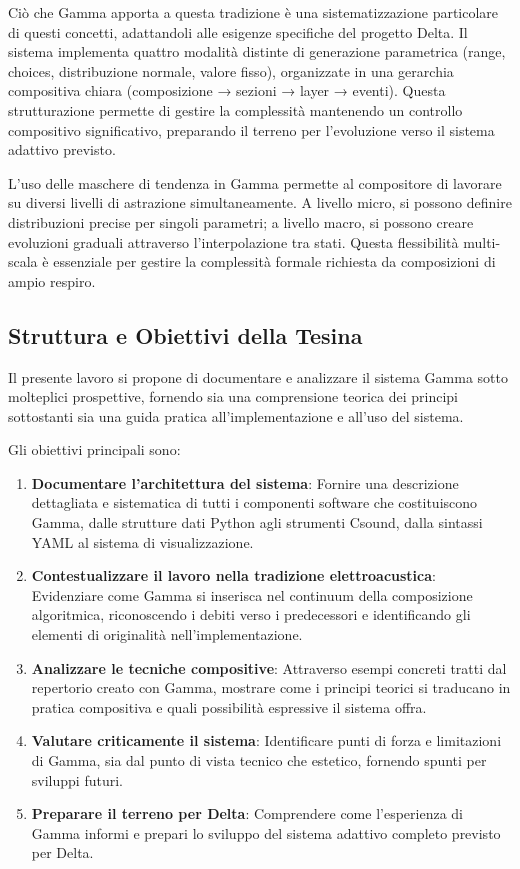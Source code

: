 Ciò che Gamma apporta a questa tradizione è una sistematizzazione particolare di questi concetti, adattandoli alle esigenze specifiche del progetto Delta. Il sistema implementa quattro modalità distinte di generazione parametrica (range, choices, distribuzione normale, valore fisso), organizzate in una gerarchia compositiva chiara (composizione → sezioni → layer → eventi). Questa strutturazione permette di gestire la complessità mantenendo un controllo compositivo significativo, preparando il terreno per l'evoluzione verso il sistema adattivo previsto.

L'uso delle maschere di tendenza in Gamma permette al compositore di lavorare su diversi livelli di astrazione simultaneamente. A livello micro, si possono definire distribuzioni precise per singoli parametri; a livello macro, si possono creare evoluzioni graduali attraverso l'interpolazione tra stati. Questa flessibilità multi-scala è essenziale per gestire la complessità formale richiesta da composizioni di ampio respiro.
\subsection{Struttura e Obiettivi della Tesina}
Il presente lavoro si propone di documentare e analizzare il sistema Gamma sotto molteplici prospettive, fornendo sia una comprensione teorica dei principi sottostanti sia una guida pratica all'implementazione e all'uso del sistema.

Gli obiettivi principali sono:

\begin{enumerate}
    \item \textbf{Documentare l'architettura del sistema}: Fornire una descrizione dettagliata e sistematica di tutti i componenti software che costituiscono Gamma, dalle strutture dati Python agli strumenti Csound, dalla sintassi YAML al sistema di visualizzazione.
    \item \textbf{Contestualizzare il lavoro nella tradizione elettroacustica}: Evidenziare come Gamma si inserisca nel continuum della composizione algoritmica, riconoscendo i debiti verso i predecessori e identificando gli elementi di originalità nell'implementazione.
    \item \textbf{Analizzare le tecniche compositive}: Attraverso esempi concreti tratti dal repertorio creato con Gamma, mostrare come i principi teorici si traducano in pratica compositiva e quali possibilità espressive il sistema offra.
    \item \textbf{Valutare criticamente il sistema}: Identificare punti di forza e limitazioni di Gamma, sia dal punto di vista tecnico che estetico, fornendo spunti per sviluppi futuri.
    \item \textbf{Preparare il terreno per Delta}: Comprendere come l'esperienza di Gamma informi e prepari lo sviluppo del sistema adattivo completo previsto per Delta.
\end{enumerate}

